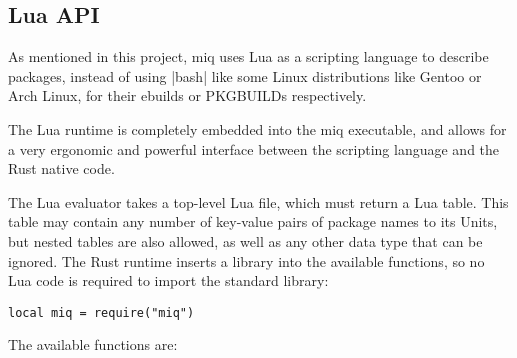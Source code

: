 \FloatBarrier
\subsection{Lua API}

As mentioned in this project, miq uses Lua as a scripting
language to describe packages, instead of using |bash| like
some Linux distributions like Gentoo or Arch Linux, for their
ebuilds or PKGBUILDs respectively.

The Lua runtime is completely embedded into the miq
executable, and allows for a very ergonomic and powerful
interface between the scripting language and the Rust native
code.

The Lua evaluator takes a top-level Lua file, which must
return a Lua table. This table may contain any number of
key-value pairs of package names to its Units, but nested
tables are also allowed, as well as any other data type that
can be ignored. The Rust runtime inserts a library into the
available functions, so no Lua code is required to import
the standard library:

\begin{verbatim}
local miq = require("miq")
\end{verbatim}

The available functions are:

